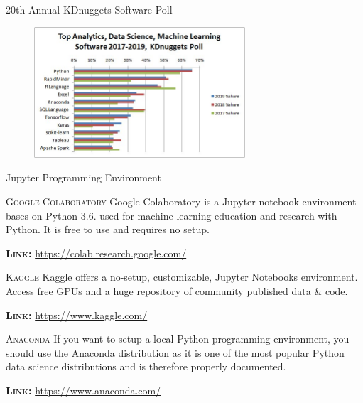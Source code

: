 \documentclass[document.tex]{subfiles}
\begin{document}
    \begin{frame}{20th Annual KDnuggets Software Poll}
        \begin{figure}
            \label{fig:kdnuggets-poll-2019}
            \includegraphics[width=0.7\textwidth]{figures/external/kdnuggets-poll-2019.jpg}
        \end{figure}
    \end{frame}
    
    \begin{frame}{Jupyter Programming Environment}
        \begin{alertblock}{\textsc{Google Colaboratory}}
        	\vspace*{.1mm}
            Google Colaboratory is a Jupyter notebook environment bases on Python 3.6. used for machine learning education and research with Python. It is free to use and requires no setup. 
            \vspace{-1mm}
            
            \textsc{\textbf{Link:}} \href{https://colab.research.google.com/}{https://colab.research.google.com/}
        \end{alertblock}
        \begin{alertblock}{\textsc{Kaggle}}  
        	\vspace*{.1mm}
            Kaggle offers a no-setup, customizable, Jupyter Notebooks environment. Access free GPUs and a huge repository of community published data \& code.
            \vspace{-1mm}

            \textsc{\textbf{Link:}} \href{https://www.kaggle.com/}{https://www.kaggle.com/}
        \end{alertblock}
        \begin{alertblock}{\textsc{Anaconda}}
        	\vspace*{.1mm}
            If you want to setup a local Python programming environment, you should use the Anaconda distribution as it is one of the most popular Python data science distributions and is therefore properly documented.
            \vspace{-1mm}
            
            \textsc{\textbf{Link:}} \href{https://www.anaconda.com/}{https://www.anaconda.com/}
        \end{alertblock}
    \end{frame}
\end{document}
